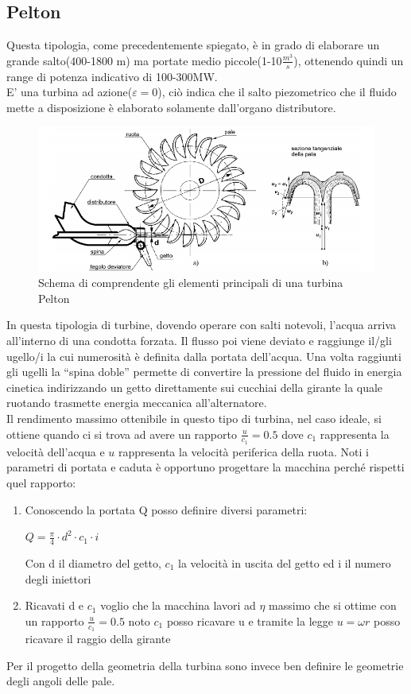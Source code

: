 \subsection{Pelton}
Questa tipologia, come precedentemente spiegato, è in grado di elaborare un grande salto(400-1800 m) ma portate medio piccole(1-10$\frac{m^3}{s}$), ottenendo quindi un range di potenza indicativo di 100-300MW.\\
E' una turbina ad azione($\varepsilon=0$), ciò indica che il salto piezometrico che il fluido mette a disposizione è elaborato solamente dall'organo distributore.\\
\begin{figure}[H]
    \centering
    \includegraphics[height=0.4\textwidth]{res/cap 3/pelton}
    \caption{Schema di comprendente gli elementi principali di una turbina Pelton}
\end{figure}\noindent
In questa tipologia di turbine, dovendo operare con salti notevoli, l'acqua arriva all'interno di una condotta forzata. Il flusso poi viene deviato e raggiunge il/gli ugello/i la cui numerosità è definita dalla portata dell'acqua.
Una volta raggiunti gli ugelli la \enquote{spina doble} permette di convertire la pressione del fluido in energia cinetica indirizzando un getto direttamente sui cucchiai della girante la quale ruotando trasmette energia meccanica all'alternatore.\\
Il rendimento massimo ottenibile in questo tipo di turbina, nel caso ideale, si ottiene quando ci si trova ad avere un rapporto $\frac{u}{c_1}=0.5$ dove $c_1$ rappresenta la velocità dell'acqua e $u$ rappresenta la velocità periferica della ruota.
Noti i parametri di portata e caduta è opportuno progettare la macchina perché rispetti quel rapporto:\\
\begin{enumerate}
    \item Conoscendo la portata Q posso definire diversi parametri:\\
        \begin{center}
            {\large$Q=\frac{\pi}{4}\cdot d^2 \cdot c_1 \cdot i$}
        \end{center}
        Con d il diametro del getto, {\large$c_1$} la velocità in uscita del getto ed i il numero degli iniettori
    \item Ricavati d e {\large$c_1$} voglio che la macchina lavori ad {\large$\eta$} massimo che si ottime con un rapporto \large{$\frac{u}{c_1}=0.5$} noto \large{$c_1$} posso ricavare u e tramite la legge {\large$u=\omega r$} posso ricavare il raggio della girante
\end{enumerate}
Per il progetto della geometria della turbina sono invece ben definire le geometrie degli angoli delle pale.
\vfill
\newpage
